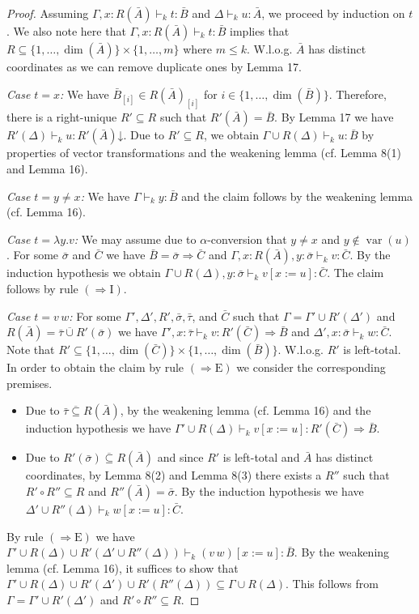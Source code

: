 \documentclass[10pt,a4paper]{article}
\newcommand{\Av}{\bar A}\newcommand{\Bv}{\bar B}\newcommand{\Cv}{\bar C}
\newcommand{\sv}{\bar\sigma}\newcommand{\tv}{\bar\tau}
\newcommand{\vsub}{\mathrel{\overline{\subseteq}}}
\newcommand{\vcup}{\mathbin{\overline{\cup}}}
\newcommand{\dimn}{\operatorname{dim}}
\newcommand{\pmjudgment}[3]{#1\vdash_k #2:#3}
\begin{document}
\begin{proof}
Assuming $\pmjudgment{\Gamma,x:R(\Av)}t\Bv$ and $\pmjudgment\Delta u\Av$, we proceed by induction on $t$. We also note here that $\pmjudgment{\Gamma,x:R(\Av)}t\Bv$ implies that $R\subseteq\{1,\ldots,\dimn(\Av)\}\times\{1,\ldots,m\}$ where $m\leq k$. W.l.o.g. $\Av$ has distinct coordinates as we can remove duplicate ones by Lemma 17.\par
\emph{Case $t=x$:} We have $\Bv_{[i]}\in R(\Av)_{[i]}$ for $i\in\{1,\ldots,\dimn(\Bv)\}$. Therefore, there is a right-unique $R'\subseteq R$ such that $R'(\Av)=\Bv$. By Lemma 17 we have $\pmjudgment{R'(\Delta)}u{R'(\Av)\mathord\downarrow}$. Due to $R'\subseteq R$, we obtain $\pmjudgment{\Gamma\cup R(\Delta)}u\Bv$ by properties of vector transformations and the weakening lemma (cf. Lemma 8(1) and Lemma 16).\par
\emph{Case $t=y\neq x$:} We have $\pmjudgment\Gamma y\Bv$ and the claim follows by the weakening lemma (cf. Lemma 16).\par
\emph{Case $t=\lambda y.v$:} We may assume due to $\alpha$-conversion that $y\neq x$ and $y\notin\operatorname{var}(u)$. For some $\sv$ and $\Cv$ we have $\Bv=\sv\Rightarrow\Cv$ and $\pmjudgment{\Gamma,x:R(\Av),y:\sv}{v}{\Cv}$. By the induction hypothesis we obtain $\pmjudgment{\Gamma\cup R(\Delta),y:\sv}{v[x:=u]}\Cv$. The claim follows by rule $(\Rightarrow\mathrm I)$.\par
\emph{Case $t=v\,w$:} For some $\Gamma',\Delta',R',\sv,\tv$, and $\Cv$ such that $\Gamma=\Gamma'\cup R'(\Delta')$ and $R(\Av)=\tv\vcup R'(\sv)$ we have $\pmjudgment{\Gamma',x:\tv}v{R'(\Cv)\Rightarrow\Bv}$ and $\pmjudgment{\Delta',x:\sv}w\Cv$.
Note that $R'\subseteq\{1,\ldots,\dimn(\Cv)\}\times\{1,\ldots,\dimn(\Bv)\}$. W.l.o.g. $R'$ is left-total. In order to obtain the claim by rule $(\Rightarrow\mathrm E)$ we consider the corresponding premises.
\begin{itemize}
\item Due to $\tv\vsub R(\Av)$, by the weakening lemma (cf. Lemma 16) and the induction hypothesis we have $\pmjudgment{\Gamma'\cup R(\Delta)}{v[x:=u]}{R'(\Cv)\Rightarrow\Bv}$.
\item Due to $R'(\sv)\vsub R(\Av)$ and since $R'$ is left-total and $\Av$ has distinct coordinates, by Lemma 8(2) and Lemma 8(3) there exists a $R''$ such that $R'\circ R''\subseteq R$ and $R''(\Av)=\sv$. By the induction hypothesis we have $\pmjudgment{\Delta'\cup R''(\Delta)}{w[x:=u]}\Cv$.
\end{itemize}
By rule $(\Rightarrow\mathrm E)$ we have $\pmjudgment{\Gamma'\cup R(\Delta)\cup R'(\Delta'\cup R''(\Delta))}{(v\,w)[x:=u]}\Bv$. By the weakening lemma (cf. Lemma 16), it suffices to show that $\Gamma'\cup R(\Delta)\cup R'(\Delta')\cup R'(R''(\Delta))\subseteq\Gamma\cup R(\Delta)$. This follows from $\Gamma=\Gamma'\cup R'(\Delta')$ and $R'\circ R''\subseteq R$.
\end{proof}
\end{document}
